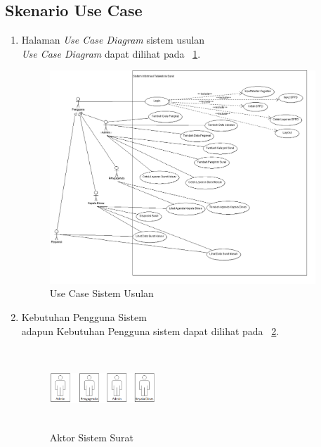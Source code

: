 \subsection{Skenario Use Case}
\begin{enumerate}
	\item	Halaman \textit{Use Case Diagram} sistem usulan\\
	\textit{Use Case Diagram} dapat dilihat pada \pic~\ref{UseCaseSistemUsulan}.
	\begin{figure}
		\centering
		\includegraphics [height=8cm, width=10cm]{konten/gambar/UML/UseCaseDiagram2.png}
		\caption{Use Case Sistem Usulan}
		\label{UseCaseSistemUsulan}
	\end{figure}
	
	\item Kebutuhan Pengguna Sistem\\
	adapun Kebutuhan Pengguna sistem dapat dilihat pada \pic~\ref{AktorSistemSurat}.
		\begin{figure}
		\centering
		\includegraphics [height=3cm, width=4cm]{konten/gambar/AktorSistemSurat.png}
		\caption{Aktor Sistem Surat}
		\label{AktorSistemSurat}
		\end{figure}
	

\end{enumerate}
